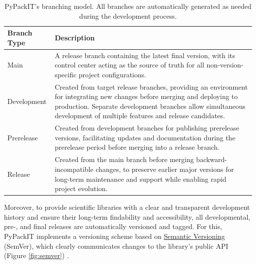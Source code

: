 \documentclass{article}
\begin{document}
\begin{table}[h!]
\centering
\caption{PyPackIT's branching model. All branches are automatically generated as needed during the development process.}
\label{table:branching-model}
\begin{tabularx}{\textwidth}{p{} X}
\toprule
\rowcolor{white} \textbf{Branch Type} & \textbf{Description} \\
\midrule

Main & A release branch containing the latest final version, with its control center acting as the source of truth for all non-version-specific project configurations. \\

Development & Created from target release branches, providing an environment for integrating new changes before merging and deploying to production. Separate development branches allow simultaneous development of multiple features and release candidates. \\

Prerelease & Created from development branches for publishing prerelease versions, facilitating updates and documentation during the prerelease period before merging into a release branch. \\

Release & Created from the main branch before merging backward-incompatible changes, to preserve earlier major versions for long-term maintenance and support while enabling rapid project evolution. \\

\bottomrule
\end{tabularx}
\end{table}

Moreover, to provide scientific libraries with a clear and transparent development history and ensure their long-term findability and accessibility, all developmental, pre-, and final releases are automatically versioned and tagged. For this, PyPackIT implements a versioning scheme based on \href{https://semver.org/}{Semantic Versioning} (SemVer), which clearly communicates changes to the library's public API (Figure \ref{fig:semver}) \cite{EmpComparisonOfDepIssues, WhatDoPackageDepsTellUsAboutSemVer}.
\end{document}
